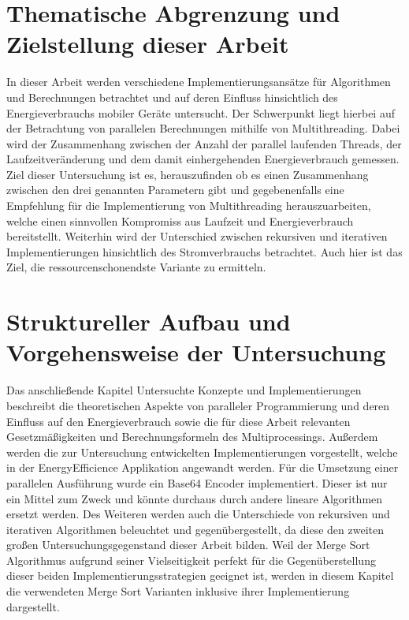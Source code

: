 \section{Thematische Abgrenzung und Zielstellung dieser Arbeit}

In dieser Arbeit werden verschiedene Implementierungsansätze für Algorithmen und Berechnungen betrachtet und auf deren Einfluss hinsichtlich des Energieverbrauchs mobiler Geräte untersucht. Der Schwerpunkt liegt hierbei auf der Betrachtung von parallelen Berechnungen mithilfe von Multithreading. Dabei wird der Zusammenhang zwischen der Anzahl der parallel laufenden Threads, der Laufzeitveränderung und dem damit einhergehenden Energieverbrauch gemessen.
Ziel dieser Untersuchung ist es, herauszufinden ob es einen Zusammenhang zwischen den drei genannten Parametern gibt und gegebenenfalls eine Empfehlung für die Implementierung von Multithreading herauszuarbeiten, welche einen sinnvollen Kompromiss aus Laufzeit und Energieverbrauch bereitstellt.
Weiterhin wird der Unterschied zwischen rekursiven und iterativen Implementierungen hinsichtlich des Stromverbrauchs betrachtet. Auch hier ist das Ziel, die ressourcenschonendste Variante zu ermitteln.


\section{Struktureller Aufbau und Vorgehensweise der Untersuchung}

Das anschließende Kapitel \glqq Untersuchte Konzepte und Implementierungen\grqq{} beschreibt die theoretischen Aspekte von paralleler Programmierung und deren Einfluss auf den Energieverbrauch sowie die für diese Arbeit relevanten Gesetzmäßigkeiten und Berechnungsformeln des Multiprocessings. Außerdem werden die zur Untersuchung entwickelten Implementierungen vorgestellt, welche in der \glqq EnergyEfficience\grqq{} Applikation angewandt werden. Für die Umsetzung einer parallelen Ausführung wurde ein Base64 Encoder implementiert. Dieser ist nur ein Mittel zum Zweck und könnte durchaus durch andere lineare Algorithmen ersetzt werden. Des Weiteren werden auch die Unterschiede von rekursiven und iterativen Algorithmen beleuchtet und gegenübergestellt, da diese den zweiten großen Untersuchungsgegenstand dieser Arbeit bilden. Weil der Merge Sort Algorithmus aufgrund seiner Vielseitigkeit perfekt für die Gegenüberstellung dieser beiden Implementierungsstrategien geeignet ist, werden in diesem Kapitel die verwendeten Merge Sort Varianten inklusive ihrer Implementierung dargestellt.

